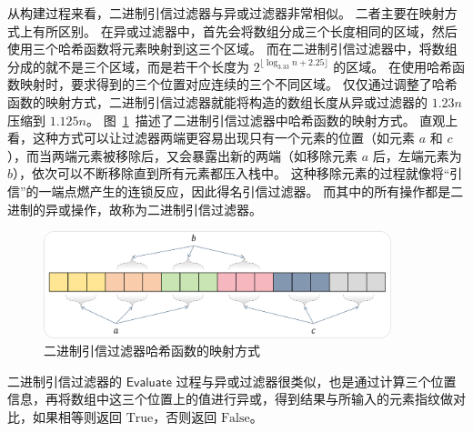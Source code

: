 从构建过程来看，二进制引信过滤器与异或过滤器非常相似。
二者主要在映射方式上有所区别。
在异或过滤器中，首先会将数组分成三个长度相同的区域，然后使用三个哈希函数将元素映射到这三个区域。
而在二进制引信过滤器中，将数组分成的就不是三个区域，而是若干个长度为 $2^{\lfloor \log_{3.33}n + 2.25\rfloor}$ 的区域。
在使用哈希函数映射时，要求得到的三个位置对应连续的三个不同区域。
仅仅通过调整了哈希函数的映射方式，二进制引信过滤器就能将构造的数组长度从异或过滤器的 $1.23n$ 压缩到 $1.125n$。
图~\ref{fig:binary_exp}~描述了二进制引信过滤器中哈希函数的映射方式。
直观上看，这种方式可以让过滤器两端更容易出现只有一个元素的位置（如元素 $a$ 和 $c$），而当两端元素被移除后，又会暴露出新的两端（如移除元素 $a$ 后，左端元素为 $b$），依次可以不断移除直到所有元素都压入栈中。
这种移除元素的过程就像将``引信''的一端点燃产生的连锁反应，因此得名引信过滤器。
而其中的所有操作都是二进制的异或操作，故称为二进制引信过滤器。
\begin{figure}[ht]
  \centering
  \includegraphics[width=0.9\textwidth]{figures/binary_exp.pdf}
  \caption{二进制引信过滤器哈希函数的映射方式}
  \label{fig:binary_exp}
\end{figure}

二进制引信过滤器的 $\mathsf{Evaluate}$ 过程与异或过滤器很类似，也是通过计算三个位置信息，再将数组中这三个位置上的值进行异或，得到结果与所输入的元素指纹做对比，如果相等则返回 $\mbox{True}$，否则返回 $\mbox{False}$。

